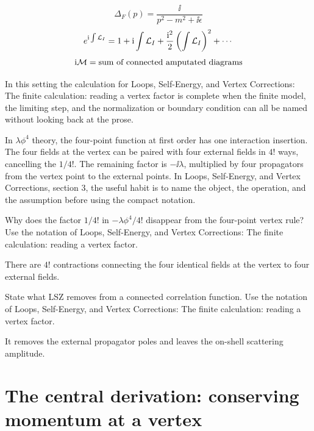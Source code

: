 \[
  \Delta_F(p)=\frac{\ii}{p^2-m^2+\ii\epsilon}
\]
\[
  e^{\mathrm i\int\mathcal L_I}=1+\mathrm i\int\mathcal L_I+\frac{\mathrm i^2}{2}\left(\int\mathcal L_I\right)^2+\cdots
\]
\[
  \mathrm i\mathcal M=\hbox{sum of connected amputated diagrams}
\]

In this setting the calculation for Loops, Self-Energy, and Vertex Corrections: The finite calculation: reading a vertex factor is complete when the finite model, the limiting step, and the normalization or boundary condition can all be named without looking back at the prose.




\begin{example}
In \(\lambda\phi^4\) theory, the four-point function at first order has one interaction insertion.  The four fields at the vertex can be paired with four external fields in \(4!\) ways, cancelling the \(1/4!\).  The remaining factor is \(-\ii\lambda\), multiplied by four propagators from the vertex point to the external points.  In Loops, Self-Energy, and Vertex Corrections, section 3, the useful habit is to name the object, the operation, and the assumption before using the compact notation.
\end{example}



\begin{exercise}
Why does the factor \(1/4!\) in \(-\lambda\phi^4/4!\) disappear from the four-point vertex rule?  Use the notation of Loops, Self-Energy, and Vertex Corrections: The finite calculation: reading a vertex factor.
\begin{answer}
There are \(4!\) contractions connecting the four identical fields at the vertex to four external fields.
\end{answer}
\end{exercise}

\begin{exercise}
State what LSZ removes from a connected correlation function.  Use the notation of Loops, Self-Energy, and Vertex Corrections: The finite calculation: reading a vertex factor.
\begin{answer}
It removes the external propagator poles and leaves the on-shell scattering amplitude.
\end{answer}
\end{exercise}



\section{The central derivation: conserving momentum at a vertex}


